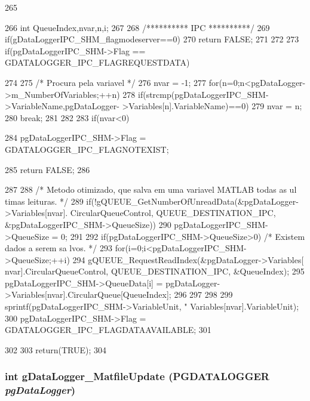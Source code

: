 \begin{DoxyCode}
265 {
266         int QueueIndex,nvar,n,i;
267 
268         /********** IPC **********/
269         if(gDataLoggerIPC_SHM_flagmodeserver==0){
270                 return FALSE;
271         }
272         
273         if(pgDataLoggerIPC_SHM->Flag == GDATALOGGER_IPC_FLAGREQUESTDATA){
274                 
275                 /* Procura pela variavel */
276                 nvar = -1;
277                 for(n=0;n<pgDataLogger->m_NumberOfVariables;++n){
278                         if(strcmp(pgDataLoggerIPC_SHM->VariableName,pgDataLogger-
      >Variables[n].VariableName)==0){
279                                 nvar = n;
280                                 break;
281                         }
282                 }
283                 if(nvar<0){
284                         pgDataLoggerIPC_SHM->Flag = GDATALOGGER_IPC_FLAGNOTEXIST;
      
285                         return FALSE; 
286                 }
287 
288                 /* Metodo otimizado, que salva em uma variavel MATLAB todas as ul
      timas leituras. */
289                 if(!gQUEUE_GetNumberOfUnreadData(&pgDataLogger->Variables[nvar].
      CircularQueueControl, QUEUE_DESTINATION_IPC, &pgDataLoggerIPC_SHM->QueueSize)){
290                         pgDataLoggerIPC_SHM->QueueSize = 0;
291                 }
292                 if(pgDataLoggerIPC_SHM->QueueSize>0){ /* Existem dados a serem sa
      lvos. */
293                         for(i=0;i<pgDataLoggerIPC_SHM->QueueSize;++i){
294                                 gQUEUE_RequestReadIndex(&pgDataLogger->Variables[
      nvar].CircularQueueControl, QUEUE_DESTINATION_IPC, &QueueIndex);
295                                 pgDataLoggerIPC_SHM->QueueData[i] = pgDataLogger-
      >Variables[nvar].CircularQueue[QueueIndex];
296                         }
297                 }
298                 
299                 sprintf(pgDataLoggerIPC_SHM->VariableUnit, "%
      Variables[nvar].VariableUnit);
300                 pgDataLoggerIPC_SHM->Flag = GDATALOGGER_IPC_FLAGDATAAVAILABLE;
301         }
302 
303         return(TRUE);
304 }
\end{DoxyCode}
\subsubsection[{gDataLogger\_\-MatfileUpdate}]{\setlength{\rightskip}{0pt plus 5cm}int gDataLogger\_\-MatfileUpdate ({\bf PGDATALOGGER} {\em pgDataLogger})}\label{gdatalogger_8h_a05dc8ce832b941280d7de26057992640}



